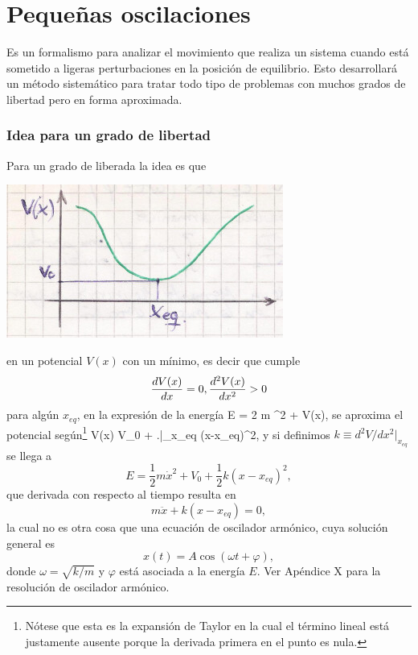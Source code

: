 \documentclass[10pt,oneside]{CBFT_book}
\begin{document}
\chapter{Pequeñas oscilaciones}

Es un formalismo para analizar el movimiento que realiza un sistema cuando está sometido a
ligeras perturbaciones en la posición de equilibrio.
Esto desarrollará un método sistemático para tratar todo tipo de problemas con muchos grados
de libertad pero en forma aproximada.

\subsection{Idea para un grado de libertad}

Para un grado de liberada la idea es que 

\includegraphics[scale=0.5]{images/fig_mc_oscil_1.jpg}

en un potencial $V(x)$ con un mínimo, es decir que cumple 
\[
	\dtot{V(x)}{x} = 0 ,\dtot[2]{V(x)}{x} > 0
\]
para algún $x_{eq}$, en la expresión de la energía
\be
	E =  2 m ^2 + V(x),
	\label{energia_1d}
\ee
se aproxima el potencial según\footnote{Nótese que esta es la expansión de Taylor en la cual el término lineal 
está justamente ausente porque la derivada primera en el punto es nula.}
\be
	V(x) \approx V_0 +  \left.\right|_{x_{eq}} (x-x_{eq})^2,
	\label{potencial_aproximado}
\ee
y si definimos $ k \equiv d^2V/dx^2|_{x_{eq}} $ se llega a 
\[
	E = \frac 1 2 m \dot{x}^2 + V_0 + \frac{1}{2} k (x-x_{eq})^2, 
\]
que derivada con respecto al tiempo resulta en 
\[
	m\ddot{x} + k (x-x_{eq}) = 0,
\]
la cual no es otra cosa que una ecuación de oscilador armónico, cuya solución general es
\[
	x(t) = A \cos (\omega t + \varphi ),
\]
donde $ \omega =  \sqrt{ k / m } $ y $ \varphi $ está asociada a la energía $E$. Ver Apéndice X para la resolución
de oscilador armónico.
\end{document}
